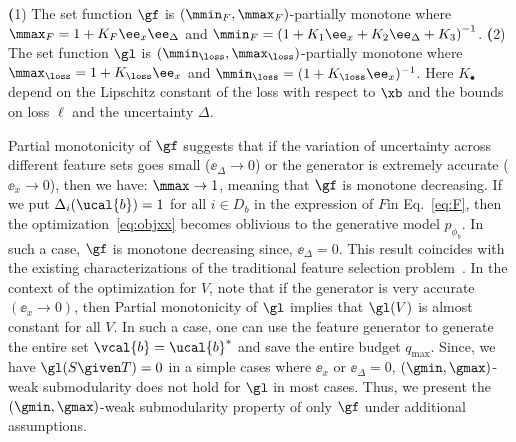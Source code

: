 \documentclass[letterpaper]{article}
\renewcommand{\cite}{\citep}
\begin{document}
\begin{theorem}
\label{thm:mon}
\textbf(1) The set function $\gf$  is $(\mmin_F,\mmax_F)$-partially monotone where  $\mmax_F = 1+ {K}_F\ee_x \ee_{\Delta }$ and $\mmin_F = \left(1+ {K}_1\ee_x +  {K}_2 \ee_{\Delta } +  {K}_3\right)^{-1}$. 
\textbf(2) The set function $\gl$  is
$(\mmin_\loss,\mmax_\loss)$-partially monotone where  $\mmax_\loss = 1+ {K}_\loss\ee_x$ and $\mmin_\loss = 
( 1+ {K}_\loss\ee_x)^{-1}$. 
%
Here ${K}_{\bullet}$ depend on the Lipschitz constant of the loss with respect to $\xb$ and the bounds  on loss $\ell$ and the uncertainty $\Delta$.  
\vspace{-2mm}
\end{theorem}
Partial monotonicity of $\gf$ suggests that if the variation of uncertainty across different feature sets goes small ($\ee_{\Delta} \to 0$) or the generator is extremely accurate  ($\ee_x \to 0$), then we have: $\mmax \to 1$, meaning that $\gf$ is monotone decreasing.
%
If we put $\Delta_i(\ucal{b}) = 1$ for all $i\in D_b$ in the expression of $F$in Eq.~\eqref{eq:F}, then the optimization~\eqref{eq:objxx} becomes  oblivious to the generative model $p_{\phi_b}$. 
In such a case,  $\gf$ is monotone decreasing since, $\ee_\Delta = 0$. This result coincides with the existing characterizations of the traditional feature selection problem~\cite{elenberg2018restricted}. 
In the context of the optimization for $V$, note that if the generator is very accurate $(\ee_x \to 0)$, then Partial monotonicity of $\gl$ implies that $\gl(V) $ is almost constant for all $V$. In such a case, one can use the feature generator to generate the entire set  $\vcal{b}=\ucal{b}^*$ and save the entire budget $q_{\max}$. Since, we have $\gl(S \given T) = 0$ in a simple cases where $\ee_x $ or $\ee_\Delta = 0$, $(\gmin,\gmax)$-weak submodularity does not hold for $\gl$ in most cases. Thus, we present the $(\gmin,\gmax)$-weak submodularity property of only $\gf$ under additional assumptions.
%
\end{document}
